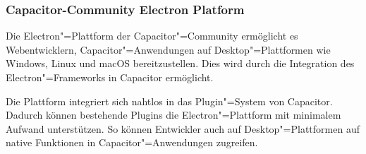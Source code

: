 \subsubsection{Capacitor-Community Electron Platform}

Die Electron"=Plattform der Capacitor"=Community ermöglicht es Webentwicklern, Capacitor"=Anwendungen auf Desktop"=Plattformen wie Windows, Linux und macOS bereitzustellen.
Dies wird durch die Integration des Electron"=Frameworks in Capacitor ermöglicht.
\cite{capacitor-electron}

Die Plattform integriert sich nahtlos in das Plugin"=System von Capacitor.~\cite{capacitor-electron}
Dadurch können bestehende Plugins die Electron"=Plattform mit minimalem Aufwand unterstützen.
So können Entwickler auch auf Desktop"=Plattformen auf native Funktionen in Capacitor"=Anwendungen zugreifen.

